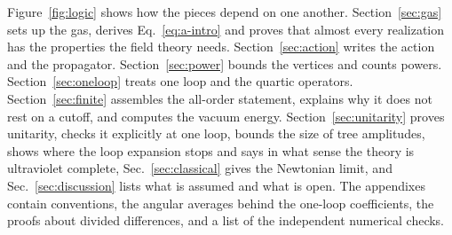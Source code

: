 \documentclass[aps,prd,10pt,twocolumn,superscriptaddress,nofootinbib,floatfix,longbibliography]{revtex4-2}
\begin{document}
Figure~\ref{fig:logic} shows how the pieces depend on one another. Section~\ref{sec:gas} sets up the gas, derives Eq.~\eqref{eq:a-intro} and proves that almost every realization has the properties the field theory needs. Section~\ref{sec:action} writes the action and the propagator. Section~\ref{sec:power} bounds the vertices and counts powers. Section~\ref{sec:oneloop} treats one loop and the quartic operators. Section~\ref{sec:finite} assembles the all-order statement, explains why it does not rest on a cutoff, and computes the vacuum energy. Section~\ref{sec:unitarity} proves unitarity, checks it explicitly at one loop, bounds the size of tree amplitudes, shows where the loop expansion stops and says in what sense the theory is ultraviolet complete, Sec.~\ref{sec:classical} gives the Newtonian limit, and Sec.~\ref{sec:discussion} lists what is assumed and what is open. The appendixes contain conventions, the angular averages behind the one-loop coefficients, the proofs about divided differences, and a list of the independent numerical checks.
\end{document}
